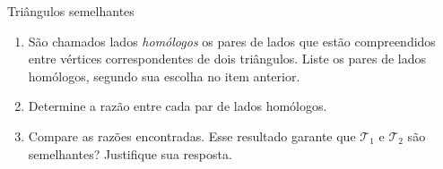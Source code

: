 \begin{task}{Triângulos semelhantes}
\begin{enumerate}
\item {} 
São chamados lados \textit{homólogos} os pares de lados que estão compreendidos entre vértices correspondentes de dois triângulos. Liste os pares de lados homólogos, segundo sua escolha no item anterior.

\item {} 
Determine a razão entre cada par de lados homólogos.

\item {} 
Compare as razões encontradas. Esse resultado garante que \(\mathcal{T}_1\) e \(\mathcal{T}_2\) são semelhantes? Justifique sua resposta.

\end{enumerate}
\end{task}





